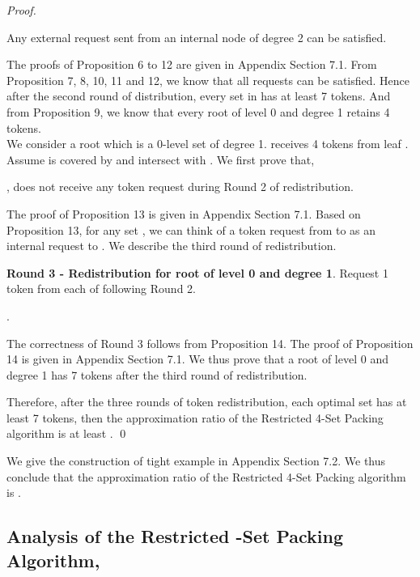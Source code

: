 \documentclass[runningheads,a4paper]{llncs}
\numberwithin{equation}{section}
\begin{document}
\begin{proof}
\begin{proposition}
Any external request sent from an internal node  of degree 2 can be satisfied.
\end{proposition}

The proofs of Proposition 6 to 12 are given in Appendix Section 7.1. From Proposition 7, 8, 10, 11 and 12, we know that all requests can be satisfied. Hence after the second round of distribution, every set in  has at least 7 tokens. And from Proposition 9, we know that every root of level 0 and degree 1 retains 4 tokens. \\


We consider a root  which is a 0-level set of degree 1.  receives 4 tokens from leaf . Assume  is covered by  and  intersect with . We first prove that,

\begin{proposition}
,  does not receive any token request during Round 2 of redistribution.
\end{proposition}

The proof of Proposition 13 is given in Appendix Section 7.1. Based on Proposition 13, for any set , we can think of a token request from  to  as an internal request to . We describe the third round of redistribution.

\textbf{Round 3 - Redistribution for root of level 0 and degree 1}. Request 1 token from each of  following Round 2.

\begin{proposition}
.
\end{proposition}

The correctness of Round 3 follows from Proposition 14. The proof of Proposition 14 is given in Appendix Section 7.1. We thus prove that a root of level 0 and degree 1 has 7 tokens after the third round of redistribution.



Therefore, after the three rounds of token redistribution, each optimal set has at least 7 tokens, then the approximation ratio of the Restricted 4-Set Packing algorithm is at least . \qed
\end{proof}

We give the construction of tight example in Appendix Section 7.2. We thus conclude that the approximation ratio of the Restricted 4-Set Packing algorithm is .


\subsection{Analysis of the Restricted -Set Packing Algorithm, }
\end{document}
